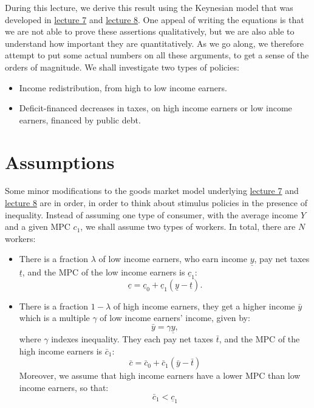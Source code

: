 \documentclass[]{book}
\theoremstyle{definition}
\theoremstyle{definition}
\theoremstyle{definition}
\theoremstyle{remark}
\begin{document}
During this lecture, we derive this result using the Keynesian model
that was developed in \protect\hyperlink{cons-function}{lecture 7} and
\protect\hyperlink{paradox-of-thrift}{lecture 8}. One appeal of writing
the equations is that we are not able to prove these assertions
qualitatively, but we are also able to understand how important they are
quantitatively. As we go along, we therefore attempt to put some actual
numbers on all these arguments, to get a sense of the orders of
magnitude. We shall investigate two types of policies:

\begin{itemize}
\item
  Income redistribution, from high to low income earners.
\item
  Deficit-financed decreases in taxes, on high income earners or low
  income earners, financed by public debt.
\end{itemize}

\section{Assumptions}\label{assumptions-4}

Some minor modifications to the goods market model underlying
\protect\hyperlink{cons-function}{lecture 7} and
\protect\hyperlink{paradox-thrift}{lecture 8} are in order, in order to
think about stimulus policies in the presence of inequality. Instead of
assuming one type of consumer, with the average income \(Y\) and a given
MPC \(c_{1}\), we shall assume two types of workers. In total, there are
\(N\) workers:

\begin{itemize}
\item
  There is a fraction \(\lambda\) of low income earners, who earn income
  \(\underline{y}\), pay net taxes \(\underline{t}\), and the MPC of the
  low income earners is \(\underline{c}_{1}\):
  \[\underline{c}=\underline{c}_{0}+\underline{c}_{1}(\underline{y}-\underline{t}).\]
\item
  There is a fraction \(1-\lambda\) of high income earners, they get a
  higher income \(\bar{y}\) which is a multiple \(\gamma\) of low income
  earners' income, given by: \[\bar{y}=\gamma\underline{y},\] where
  \(\gamma\) indexes inequality. They each pay net taxes \(\bar{t}\),
  and the MPC of the high income earners is \(\bar{c}_{1}\):
  \[\bar{c}=\bar{c}_{0}+\bar{c}_{1}(\bar{y}-\bar{t})\] Moreover, we
  assume that high income earners have a lower MPC than low income
  earners, so that: \[\bar{c}_{1}<\underline{c}_{1}\]
\end{itemize}
\end{document}
